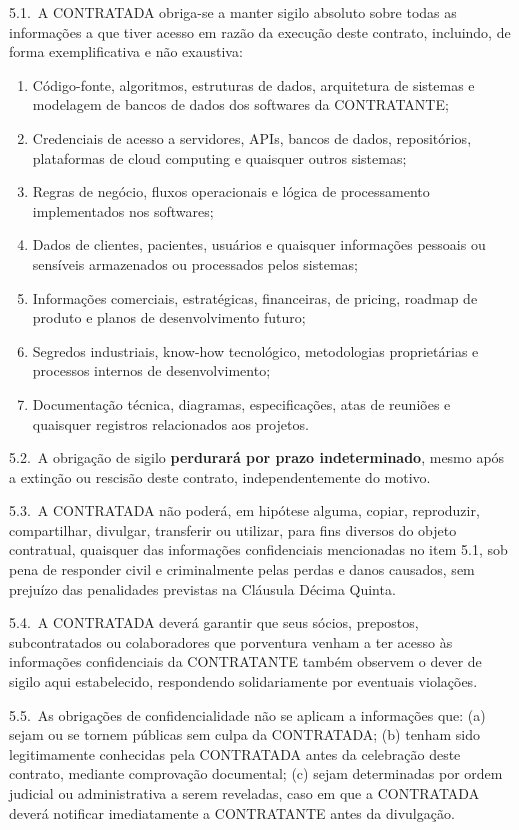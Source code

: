 \documentclass[11pt, a4paper]{article}
\begin{document}
5.1.\ A CONTRATADA obriga-se a manter sigilo absoluto sobre todas as informações a que tiver acesso em razão da execução deste contrato, incluindo, de forma exemplificativa e não exaustiva:

\begin{enumerate}[label=\alph*), leftmargin=1.8em]
    \item Código-fonte, algoritmos, estruturas de dados, arquitetura de sistemas e modelagem de bancos de dados dos softwares da CONTRATANTE;
    \item Credenciais de acesso a servidores, APIs, bancos de dados, repositórios, plataformas de cloud computing e quaisquer outros sistemas;
    \item Regras de negócio, fluxos operacionais e lógica de processamento implementados nos softwares;
    \item Dados de clientes, pacientes, usuários e quaisquer informações pessoais ou sensíveis armazenados ou processados pelos sistemas;
    \item Informações comerciais, estratégicas, financeiras, de pricing, roadmap de produto e planos de desenvolvimento futuro;
    \item Segredos industriais, know-how tecnológico, metodologias proprietárias e processos internos de desenvolvimento;
    \item Documentação técnica, diagramas, especificações, atas de reuniões e quaisquer registros relacionados aos projetos.
\end{enumerate}

5.2.\ A obrigação de sigilo \textbf{perdurará por prazo indeterminado}, mesmo após a extinção ou rescisão deste contrato, independentemente do motivo.

5.3.\ A CONTRATADA não poderá, em hipótese alguma, copiar, reproduzir, compartilhar, divulgar, transferir ou utilizar, para fins diversos do objeto contratual, quaisquer das informações confidenciais mencionadas no item 5.1, sob pena de responder civil e criminalmente pelas perdas e danos causados, sem prejuízo das penalidades previstas na Cláusula Décima Quinta.

5.4.\ A CONTRATADA deverá garantir que seus sócios, prepostos, subcontratados ou colaboradores que porventura venham a ter acesso às informações confidenciais da CONTRATANTE também observem o dever de sigilo aqui estabelecido, respondendo solidariamente por eventuais violações.

5.5.\ As obrigações de confidencialidade não se aplicam a informações que: (a) sejam ou se tornem públicas sem culpa da CONTRATADA; (b) tenham sido legitimamente conhecidas pela CONTRATADA antes da celebração deste contrato, mediante comprovação documental; (c) sejam determinadas por ordem judicial ou administrativa a serem reveladas, caso em que a CONTRATADA deverá notificar imediatamente a CONTRATANTE antes da divulgação.
\end{document}

